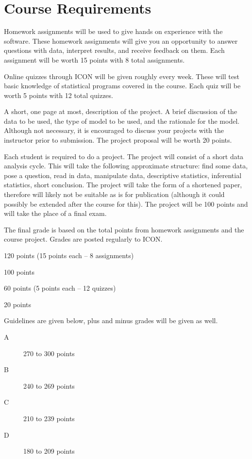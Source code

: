 \documentclass[11pt,article,oneside]{memoir}
\begin{document}
\section*{Course Requirements}
\begin{description}[font=\large\bfseries]
\item[Homework] 
Homework assignments will be used to give hands on experience with the software. These homework assignments will give you an opportunity to answer questions with data, interpret results, and receive feedback on them. Each assignment will be worth 15 points with 8 total assignments. 
\item[Quizzes]
Online quizzes through ICON will be given roughly every week. These will test basic knowledge of statistical programs covered in the course. Each quiz will be worth 5 points with 12 total quizzes.
\item[Project Proposal] 
A short, one page at most, description of the project. A brief discussion of the data to be used, the type of model to be used, and the rationale for the model. Although not necessary, it is encouraged to discuss your projects with the instructor prior to submission. The project proposal will be worth 20 points.
\item[Project]
Each student is required to do a project. The project will consist of a short data analysis cycle. This will take the following approximate structure: find some data, pose a question, read in data, manipulate data, descriptive statistics, inferential statistics, short conclusion. The project will take the form of a shortened paper, therefore will likely not be suitable as is for publication (although it could possibly be extended after the course for this). The project will be 100 points and will take the place of a final exam.
\item[Grading]
The final grade is based on the total points from homework assignments and the course project. Grades are posted regularly to ICON. 
 \begin{description}[noitemsep]
 \item[Homework assignments] 120 points (15 points each -- 8 assignments)
 \item[Project] 100 points
 \item[Quizzes] 60 points (5 points each -- 12 quizzes)
 \item[Project Proposal] 20 points
\item[Point Breakdown] Guidelines are given below, plus and minus grades will be given as well.
 \begin{description}
 \item[A] 270 to 300 points		 
 \item[B] 240 to 269 points		
 \item[C] 210 to 239 points   
 \item[D] 180 to 209 points
 \end{description}
 \end{description}
\end{description}
\end{document}
